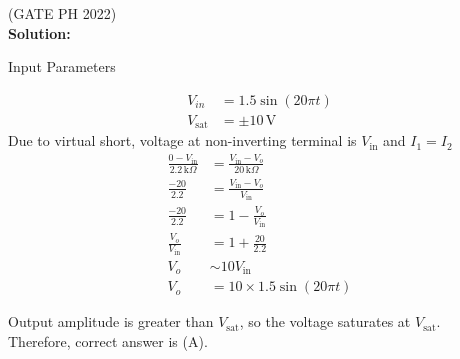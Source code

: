 \documentclass[journal,12pt,twocolumn]{IEEEtran}
\begin{document}
\hfill{(GATE PH 2022)}\\
\textbf{Solution:} \\
\fi
\begin{table}[htbp]
  \centering
  
  \caption{Input Parameters}

\end{table}
\begin{align}
V_{in} &= 1.5 \sin(20\pi t)\\
V_{\text{sat}} &= \pm 10 \, \text{V}
\end{align}
Due to virtual short, voltage at non-inverting terminal is \( V_{\text{in}} \) and $I_1 = I_2$\\
\begin{align}
\frac{0 - V_{\text{in}}}{2.2 \, \text{k}\Omega} &= \frac{V_{\text{in}} - V_o}{20 \, \text{k}\Omega}\\
\frac{-20}{2.2} &= \frac{V_{\text{in}} - V_o}{V_{\text{in}}}\\
\frac{-20}{2.2} &= 1 - \frac{V_o}{V_{\text{in}}}\\
\frac{V_o}{V_{\text{in}}} &= 1 + \frac{20}{2.2}\\
V_o &\sim 10 V_{\text{in}}\\
V_o &= 10 \times 1.5 \sin(20\pi t)
\end{align}

Output amplitude is greater than $V_{\text{sat}}$, so the voltage saturates at $V_{\text{sat}}$.\\
Therefore, correct answer is (A).
\end{document}

